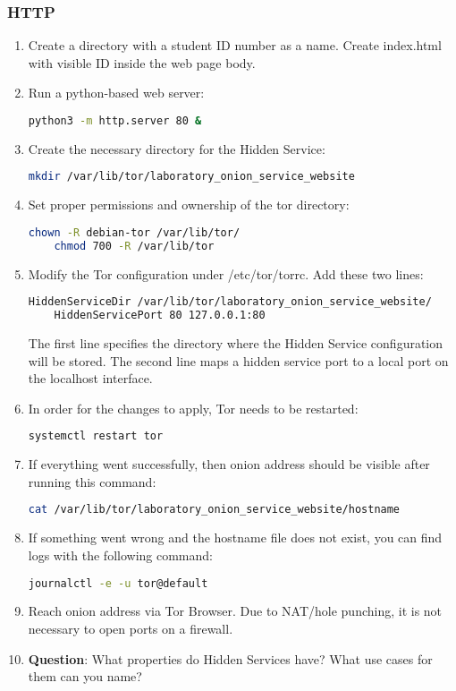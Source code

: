 \subsubsection{HTTP}
\begin{enumerate}
    \item Create a directory with a student ID number as a name. Create index.html with visible ID inside the web page body.
    \item Run a python-based web server:
    \begin{lstlisting}[language=bash]
    python3 -m http.server 80 &
    \end{lstlisting}
    \item Create the necessary directory for the Hidden Service:
    \begin{lstlisting}[language=bash]
    mkdir /var/lib/tor/laboratory_onion_service_website
    \end{lstlisting}
    \item Set proper permissions and ownership of the tor directory:
    \begin{lstlisting}[language=bash]
    chown -R debian-tor /var/lib/tor/
    chmod 700 -R /var/lib/tor
    \end{lstlisting}
    \item Modify the Tor configuration under /etc/tor/torrc. Add these two lines:
    \begin{lstlisting}[language=bash]
    HiddenServiceDir /var/lib/tor/laboratory_onion_service_website/
    HiddenServicePort 80 127.0.0.1:80
    \end{lstlisting}
    The first line specifies the directory where the Hidden Service configuration will be stored. The second line maps a hidden service port to a local port on the localhost interface.
    \item In order for the changes to apply, Tor needs to be restarted:
    \begin{lstlisting}[language=bash]
    systemctl restart tor
    \end{lstlisting}
    \item If everything went successfully, then onion address should be visible after running this command:
    \begin{lstlisting}[language=bash]
    cat /var/lib/tor/laboratory_onion_service_website/hostname
    \end{lstlisting}
    \item If something went wrong and the hostname file does not exist, you can find logs with the following command:
    \begin{lstlisting}[language=bash]
    journalctl -e -u tor@default
    \end{lstlisting}
    \item Reach onion address via Tor Browser. Due to NAT/hole punching, it is not necessary to open ports on a firewall.
    \item \textbf{Question}: What properties do Hidden Services have? What use cases for them can you name?
\end{enumerate}


